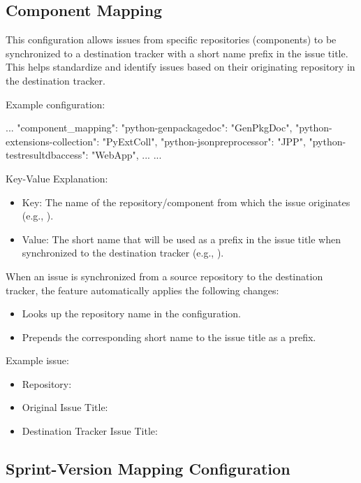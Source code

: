 \subsection{Component Mapping}
This configuration allows issues from specific repositories (components) to be
synchronized to a destination tracker with a short name prefix in the issue
title.
This helps standardize and identify issues based on their originating repository
in the destination tracker.

Example configuration:
\begin{pythoncode}
{
   ...
   "component_mapping": {
      "python-genpackagedoc": "GenPkgDoc",
      "python-extensions-collection": "PyExtColl",
      "python-jsonpreprocessor": "JPP",
      "python-testresultdbaccess": "WebApp",
      ...
   }
   ...
}
\end{pythoncode}

Key-Value Explanation:
\begin{itemize}
   \item Key: The name of the repository/component from which the issue
         originates (e.g., ).
   \item Value: The short name that will be used as a prefix in the issue title
         when synchronized to the destination tracker (e.g., ).
\end{itemize}

When an issue is synchronized from a source repository to the destination
tracker, the feature automatically applies the following changes:
\begin{itemize}
   \item Looks up the repository name in the  configuration.
   \item Prepends the corresponding short name to the issue title as a prefix.
\end{itemize}

Example issue:
\begin{itemize}
   \item Repository: 
   \item Original Issue Title: 
   \item Destination Tracker Issue Title: 
\end{itemize}

\subsection{Sprint-Version Mapping Configuration}

